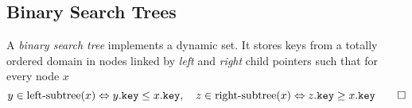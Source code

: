 

\subsection{Binary Search Trees}
\label{subsec:bst}

\begin{definition}
A \emph{binary search tree} implements a dynamic set. It stores keys from a totally ordered domain in nodes linked by \emph{left} and \emph{right} child pointers such that for every node \(x\)
\[
y\in\text{left-subtree}(x) \Leftrightarrow  y\mathtt{.}\mathtt{key}\le x\mathtt{.}\mathtt{key}
,\quad
z\in\text{right-subtree}(x)\Leftrightarrow  z\mathtt{.}\mathtt{key}\ge x\mathtt{.}\mathtt{key}\qedhere
\]
\end{definition}





